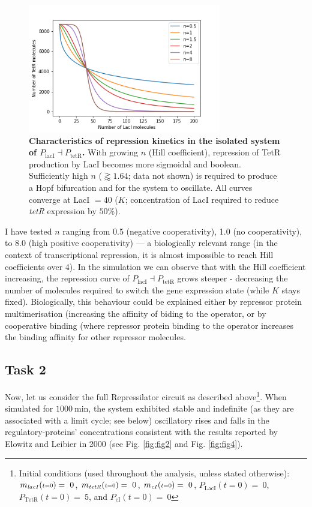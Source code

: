 \documentclass[runningheads,a4paper]{llncs}
\begin{document}
\begin{figure}
    \singlespacing
    \centering
    \includegraphics[width=0.75\textwidth]{suplementary_information_and_code/Task1_figure1.png}
    \caption{\textbf{Characteristics of repression kinetics in the isolated system of $P_{\textrm{lacI}} \dashv P_{\textrm{tetR}}$.} With growing $n$ (Hill coefficient), repression of TetR production by LacI becomes more sigmoidal and boolean. Sufficiently high $n$ ($\gtrapprox 1.64$; data not shown) is required to produce a Hopf bifurcation and for the system to oscillate. All curves converge at LacI $= 40$ ($K$; concentration of LacI required to reduce \textit{tetR} expression by $50 \%$).}
    \label{fig:fig3}
\end{figure}

I have tested $n$ ranging from 0.5 (negative cooperativity), 1.0 (no cooperativity), to 8.0 (high positive cooperativity) --- a biologically relevant range (in the context of transcriptional repression, it is almost impossible to reach Hill coefficients over 4\cite{Gonze2013a}). In the simulation we can observe that with the Hill coefficient increasing, the repression curve of $P_{\textrm{lacI}} \dashv P_{\textrm{tetR}}$ grows steeper - decreasing the number of molecules required to switch the gene expression state (while $K$ stays fixed). Biologically, this behaviour could be explained either by repressor protein multimerisation (increasing the affinity of biding to the operator, or by cooperative binding (where repressor protein binding to the operator increases the binding affinity for other repressor molecules\cite{Gonze2013a}.

\subsection*{Task 2}
Now, let us consider the full Repressilator circuit as described above\footnote{Initial conditions (used throughout the analysis, unless stated otherwise): $m_{\textrm{\textit{lacI}}}({\scriptstyle t=0}) =\ 0$, $m_{\textrm{\textit{tetR}}}({\scriptstyle t=0}) =\ 0$, $m_{\textrm{\textit{cI}}}({\scriptstyle t=0}) =\ 0$, $P_{\textrm{LacI}}({\scriptstyle t=0}) =\ 0$, $P_{\textrm{TetR}}({\scriptstyle t=0}) =\ 5$, and $P_{\textrm{cI}}({\scriptstyle t=0}) =\ 0$}. When simulated for $1000\ \textrm{min}$, the system exhibited stable and indefinite (as they are associated with a limit cycle; see below) oscillatory rises and falls in the regulatory-proteins' concentrations consistent with the results reported by Elowitz and Leibier in 2000\cite{Elowitz2000d} (see Fig. \ref{fig:fig2} and Fig. \ref{fig:fig4}).
\end{document}

